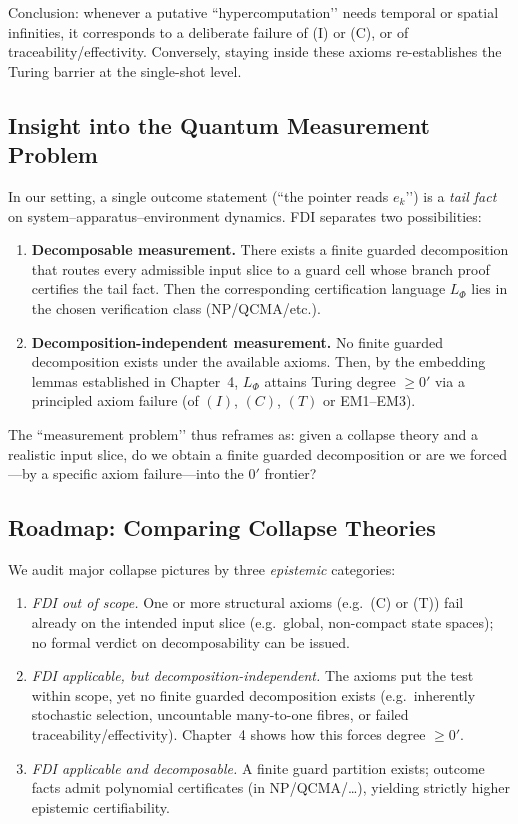 \documentclass[12pt]{article}
\theoremstyle{definition}
\theoremstyle{plain}
\begin{document}
\noindent
Conclusion: whenever a putative “hypercomputation’’ needs temporal or spatial infinities, it corresponds to a deliberate failure of (I) or (C), or of traceability/effectivity. Conversely, staying inside these axioms re-establishes the Turing barrier at the single-shot level.


\subsection{Insight into the Quantum Measurement Problem}
\label{subsec:quantum-meas}

In our setting, a single outcome statement (“the pointer reads $e_k$’’) is a \emph{tail fact} on system–apparatus–environment dynamics. FDI separates two possibilities:

\begin{enumerate}[itemsep=3pt]
  \item \textbf{Decomposable measurement.} There exists a finite guarded decomposition that routes every admissible input slice to a guard cell whose branch proof certifies the tail fact. Then the corresponding certification language $L_\Phi$ lies in the chosen verification class (NP/QCMA/etc.).
  \item \textbf{Decomposition-independent measurement.} No finite guarded decomposition exists under the available axioms. Then, by the embedding lemmas established in Chapter~4, $L_\Phi$ attains Turing degree $\ge 0'$ via a principled axiom failure (of $(I)$, $(C)$, $(T)$ or EM1–EM3).
\end{enumerate}

\noindent
The “measurement problem’’ thus reframes as: given a collapse theory and a realistic input slice, do we obtain a finite guarded decomposition or are we forced—by a specific axiom failure—into the $0'$ frontier?

\subsection{Roadmap: Comparing Collapse Theories}
\label{subsec:roadmap-collapse}

We audit major collapse pictures by three \emph{epistemic} categories:

\begin{enumerate}[label={Category (\arabic*)},itemsep=3pt]
  \item \emph{FDI out of scope.} One or more structural axioms (e.g.\ (C) or (T)) fail already on the intended input slice (e.g.\ global, non-compact state spaces); no formal verdict on decomposability can be issued.
  \item \emph{FDI applicable, but decomposition-independent.} The axioms put the test within scope, yet no finite guarded decomposition exists (e.g.\ inherently stochastic selection, uncountable many-to-one fibres, or failed traceability/effectivity). Chapter~4 shows how this forces degree $\ge 0'$.
  \item \emph{FDI applicable and decomposable.} A finite guard partition exists; outcome facts admit polynomial certificates (in NP/QCMA/\ldots), yielding strictly higher epistemic certifiability.
\end{enumerate}
\end{document}
